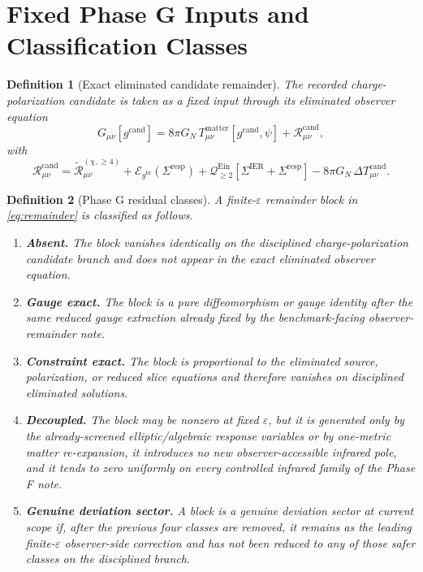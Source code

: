 \documentclass[11pt]{article}
\newcommand{\ObserverMetric}{g^{\mathrm{br}}}
\newcommand{\CandidateMetric}{g^{\mathrm{cand}}}
\newcommand{\BaseShift}{\Sigma^{\mathrm{IER}}}
\newcommand{\ResponseShift}{\Sigma^{\mathrm{resp}}}
\newcommand{\ReLongFour}{\widetilde{\mathcal R}_{\mu\nu}^{(\chi,\ge 4)}}
\newcommand{\DeltaTCand}{\Delta T_{\mu\nu}^{\mathrm{cand}}}
\newcommand{\RemCand}{\mathcal R_{\mu\nu}^{\mathrm{cand}}}
\newcommand{\EinLin}{\mathcal E_{\ObserverMetric}}
\newcommand{\EinQuad}{\mathcal Q_{\ge 2}^{\mathrm{Ein}}}
\newcommand{\epsIR}{\varepsilon}
\newtheorem{definition}{Definition}
\begin{document}
\section{Fixed Phase G Inputs and Classification Classes}

\begin{definition}[Exact eliminated candidate remainder]
\label{def:remainder}
The recorded charge-polarization candidate is taken as a fixed input through its eliminated observer equation
\begin{equation}
G_{\mu\nu}[\CandidateMetric]
=
8\pi G_N\,T_{\mu\nu}^{\mathrm{matter}}[\CandidateMetric,\psi]
+\RemCand,
\label{eq:observer}
\end{equation}
with
\begin{equation}
\RemCand
=
\ReLongFour
+\EinLin(\ResponseShift)
+\EinQuad[\BaseShift+\ResponseShift]
-8\pi G_N\,\DeltaTCand.
\label{eq:remainder}
\end{equation}
\end{definition}

\begin{definition}[Phase G residual classes]
\label{def:classes}
A finite-\(\epsIR\) remainder block in \eqref{eq:remainder} is classified as follows.
\begin{enumerate}
    \item \textbf{Absent.} The block vanishes identically on the disciplined charge-polarization candidate branch and does not appear in the exact eliminated observer equation.
    \item \textbf{Gauge exact.} The block is a pure diffeomorphism or gauge identity after the same reduced gauge extraction already fixed by the benchmark-facing observer-remainder note.
    \item \textbf{Constraint exact.} The block is proportional to the eliminated source, polarization, or reduced slice equations and therefore vanishes on disciplined eliminated solutions.
    \item \textbf{Decoupled.} The block may be nonzero at fixed \(\epsIR\), but it is generated only by the already-screened elliptic/algebraic response variables or by one-metric matter re-expansion, it introduces no new observer-accessible infrared pole, and it tends to zero uniformly on every controlled infrared family of the Phase F note.
    \item \textbf{Genuine deviation sector.} A block is a genuine deviation sector at current scope if, after the previous four classes are removed, it remains as the leading finite-\(\epsIR\) observer-side correction and has not been reduced to any of those safer classes on the disciplined branch.
\end{enumerate}
\end{definition}
\end{document}

